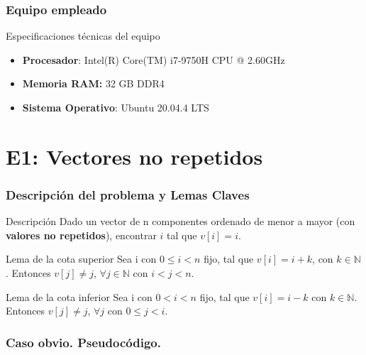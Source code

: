 \documentclass[13pt]{beamer}
\begin{document}
    \begin{frame}
        \frametitle{Equipo empleado}

        \begin{block}{Especificaciones técnicas del equipo}
            \begin{itemize}
                \item \textbf{Procesador}: Intel(R) Core(TM) i7-9750H CPU @ 2.60GHz
                \item \textbf{Memoria RAM:} 32 GB DDR4
                \item \textbf{Sistema Operativo}: Ubuntu 20.04.4 LTS
            \end{itemize}
        \end{block}
    \end{frame}



    \section{E1: Vectores no repetidos}

    \begin{frame}
        \frametitle{Descripción del problema y Lemas Claves}

            \begin{block}{Descripción}
                Dado un vector de n componentes ordenado de menor a mayor (con \textbf{valores no repetidos}), 
                encontrar $i$ tal que $v[i] = i$. 
            \end{block}

            \begin{alertblock}{Lema de la cota superior}
                \label{lem:1}
                Sea i con $0 \leqslant i < n$ fijo, tal que $v[i]=i+k$, con $k \in \mathbb N$. 
                Entonces $v[j] \neq j$, $\forall j \in \mathbb N$ con $i < j < n$. 
            \end{alertblock}
            \begin{alertblock}{Lema de la cota inferior}
                \label{lem:2}
                Sea i con $0 < i < n$ fijo, tal que $v[i]=i-k$ con 
                $k \in \mathbb N$. Entonces $v[j] \neq j$,  $\forall j$ con $0 \leqslant j < i$. 
            \end{alertblock}
    \end{frame}

	 \begin{frame}
		\frametitle{Caso obvio. Pseudocódigo.}
		
	\end{frame}
\end{document}
